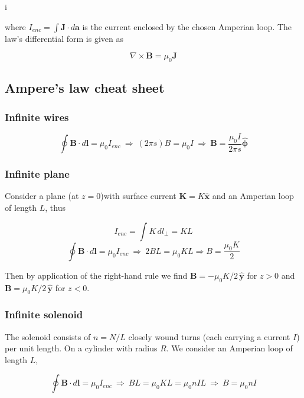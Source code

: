i\documentclass[a4paper]{article}
\begin{document}
where $I_{enc}=\int \bm{J}\cdot d\bm{a}$ is the current enclosed by the chosen Amperian loop. The law's differential form is given as

\begin{equation}
    \nabla\times\bm{B}=\mu_0\bm{J}
\end{equation}

\subsection{Ampere's law cheat sheet}

\subsubsection*{Infinite wires}
\begin{equation}
    \oint \bm{B}\cdot d\bm{l} = \mu_0 I_{enc}\ \Rightarrow\ (2\pi s)B=\mu_0 I\ \Rightarrow\ \bm{B}=\frac{\mu_0 I}{2\pi s}\hat{\bm{\phi}}
\end{equation}
\subsubsection*{Infinite plane}
Consider a plane (at $z=0$)with surface current $\bm{K}=K\hat{\bm{x}}$ and an Amperian loop of length $L$, thus

\begin{equation}
    I_{enc}=\int K\,dl_{\perp} = KL
\end{equation}
\begin{equation}
    \oint \bm{B}\cdot d\bm{l} = \mu_0 I_{enc}\ \Rightarrow\ 2BL=\mu_0 K L \Rightarrow B = \frac{\mu_0 K}{2}
\end{equation}

Then by application of the right-hand rule we find $\bm{B}=-\mu_0 K/2\,\hat{\bm{y}}$ for $z>0$ and $\bm{B}=\mu_0 K/2\,\hat{\bm{y}}$ for $z<0$.

\subsubsection*{Infinite solenoid}
The solenoid consists of $n=N/L$ closely wound turns (each carrying a current $I$) per unit length. On a cylinder with radius $R$. We consider an Amperian loop of length $L$,

\begin{equation}
    \oint \bm{B}\cdot d\bm{l} = \mu_0 I_{enc}\ \Rightarrow\ BL=\mu_0KL=\mu_0nIL \ \Rightarrow\ B=\mu_0nI
\end{equation}
\end{document}
